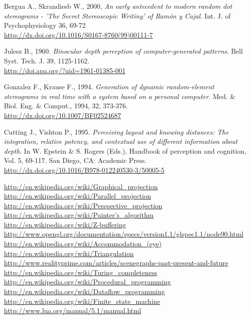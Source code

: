 \begin{thebibliography}{12}
Bergua A., Skrandiesb W., 2000,
\textit{An early antecedent to modern random dot stereograms - 'The Secret Stereoscopic Writing' of Ram\'on y Cajal}.
Int. J. of Psychophysiology 36, 69-72\\
\url{http://dx.doi.org/10.1016/S0167-8760(99)00111-7}

Julesz B., 1960.
\textit{Binocular depth perception of computer-generated patterns}.
Bell Syst. Tech. J. 39, 1125-1162.\\
\url{http://doi.apa.org/?uid=1961-01385-001}

Gonzalez F., Krause F., 1994.
\textit{Generation of dynamic random-element stereograms in real time with a system based on a personal computer}.
Med. \& Biol. Eng. \& Comput., 1994, 32, 373-376.\\
\url{http://dx.doi.org/10.1007/BF02524687}

Cutting J., Vishton P., 1995.
\textit{Perceiving layout and knowing distances: The integration, relative potency, and contextual use of different information about depth}.
In W. Epstein \& S. Rogers (Eds.), Handbook of perception and cognition, Vol. 5, 69-117. San Diego, CA: Academic Press.\\
\url{http://dx.doi.org/10.1016/B978-012240530-3/50005-5}

\end{thebibliography}

\renewcommand*\refname{Links}

\begin{thebibliography}{12}
 \url{http://en.wikipedia.org/wiki/Graphical_projection}
 \url{http://en.wikipedia.org/wiki/Parallel_projection}
 \url{http://en.wikipedia.org/wiki/Perspective_projection}
 \url{http://en.wikipedia.org/wiki/Painter's_algorithm}
 \url{http://en.wikipedia.org/wiki/Z-buffering}
 \url{http://www.opengl.org/documentation/specs/version1.1/glspec1.1/node90.html}
 \url{http://en.wikipedia.org/wiki/Accommodation_(eye)}
 \url{http://en.wikipedia.org/wiki/Triangulation}
 \url{http://www.realityprime.com/articles/scenegraphs-past-present-and-future}
 \url{http://en.wikipedia.org/wiki/Turing_completeness}
 \url{http://en.wikipedia.org/wiki/Procedural_programming}
 \url{http://en.wikipedia.org/wiki/Dataflow_programming}
 \url{http://en.wikipedia.org/wiki/Finite_state_machine}
 \url{http://www.lua.org/manual/5.1/manual.html}
\end{thebibliography}
